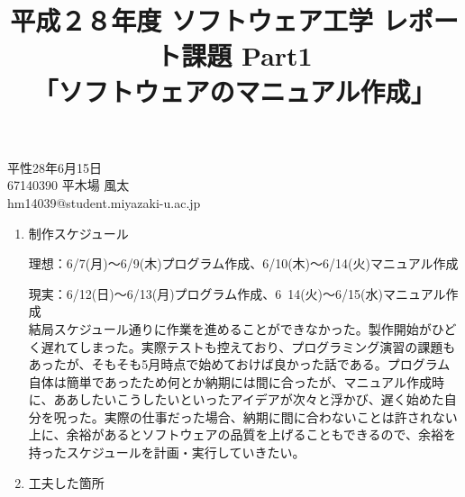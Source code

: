 \documentclass[10.5pt]{jsarticle}
\begin{document}
\title{平成２８年度 ソフトウェア工学 レポート課題 Part1\\「ソフトウェアのマニュアル作成」}
\date{}
\maketitle

\begin{flushright}
{\large 平性28年6月15日}\\
{\large 67140390 平木場 風太}\\
{\large hm14039@student.miyazaki-u.ac.jp}\\
\end{flushright}

\vspace{0.5in}

\begin{large}
\begin{enumerate}
\item 制作スケジュール

理想：6/7(月)〜6/9(木)プログラム作成、6/10(木)〜6/14(火)マニュアル作成

現実：6/12(日)〜6/13(月)プログラム作成、6~14(火)〜6/15(水)マニュアル作成\\

結局スケジュール通りに作業を進めることができなかった。製作開始がひどく遅れてしまった。実際テストも控えており、プログラミング演習の課題もあったが、そもそも5月時点で始めておけば良かった話である。プログラム自体は簡単であったため何とか納期には間に合ったが、マニュアル作成時に、ああしたいこうしたいといったアイデアが次々と浮かび、遅く始めた自分を呪った。実際の仕事だった場合、納期に間に合わないことは許されない上に、余裕があるとソフトウェアの品質を上げることもできるので、余裕を持ったスケジュールを計画・実行していきたい。\\


\item 工夫した箇所


\end{enumerate}
\end{large}
\end{document}
